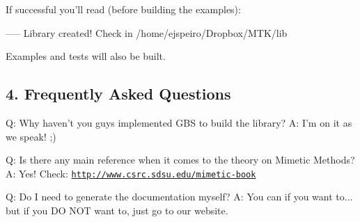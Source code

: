 \begin{DoxyPre}
\end{DoxyPre}



\begin{DoxyPre}If successful you'll read (before building the examples):\end{DoxyPre}



\begin{DoxyPre}\begin{DoxyVerb}----- Library created! Check in /home/ejspeiro/Dropbox/MTK/lib
\end{DoxyVerb}
\end{DoxyPre}



\begin{DoxyPre}Examples and tests will also be built.


\end{DoxyPre}



\begin{DoxyPre}\subsection*{4. Frequently Asked Questions}\end{DoxyPre}



\begin{DoxyPre}\end{DoxyPre}



\begin{DoxyPre}Q: Why haven't you guys implemented GBS to build the library?
A: I'm on it as we speak! ;)\end{DoxyPre}



\begin{DoxyPre}Q: Is there any main reference when it comes to the theory on Mimetic Methods?
A: Yes! Check: \href{http://www.csrc.sdsu.edu/mimetic-book}{\tt http://www.csrc.sdsu.edu/mimetic-book}\end{DoxyPre}



\begin{DoxyPre}Q: Do I need to generate the documentation myself?
A: You can if you want to... but if you DO NOT want to, just go to our website.


\end{DoxyPre}



